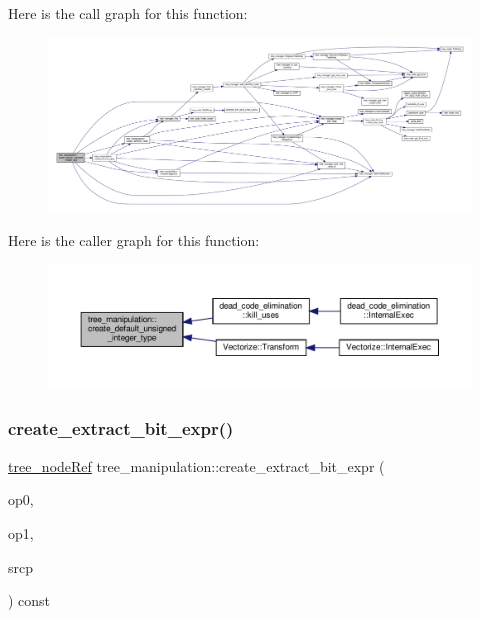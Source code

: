Here is the call graph for this function\+:
\nopagebreak
\begin{figure}[H]
\begin{center}
\leavevmode
\includegraphics[width=350pt]{d0/d99/classtree__manipulation_ad82ac6edb2beb3019c28f6758665e6d8_cgraph}
\end{center}
\end{figure}
Here is the caller graph for this function\+:
\nopagebreak
\begin{figure}[H]
\begin{center}
\leavevmode
\includegraphics[width=350pt]{d0/d99/classtree__manipulation_ad82ac6edb2beb3019c28f6758665e6d8_icgraph}
\end{center}
\end{figure}
\mbox{\label{classtree__manipulation_a81c9b97eea8118088f9631d222b443cf}} 
\subsubsection{\texorpdfstring{create\+\_\+extract\+\_\+bit\+\_\+expr()}{create\_extract\_bit\_expr()}}
{\footnotesize\ttfamily \hyperlink{tree__node_8hpp_a6ee377554d1c4871ad66a337eaa67fd5}{tree\+\_\+node\+Ref} tree\+\_\+manipulation\+::create\+\_\+extract\+\_\+bit\+\_\+expr (\begin{DoxyParamCaption}\item[{const \hyperlink{tree__node_8hpp_a6ee377554d1c4871ad66a337eaa67fd5}{tree\+\_\+node\+Ref} \&}]{op0,  }\item[{const \hyperlink{tree__node_8hpp_a6ee377554d1c4871ad66a337eaa67fd5}{tree\+\_\+node\+Ref} \&}]{op1,  }\item[{const std\+::string \&}]{srcp }\end{DoxyParamCaption}) const}



